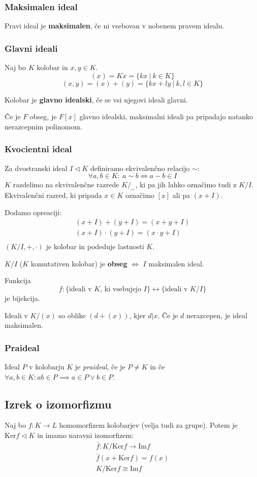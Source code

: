 \subsubsection*{Maksimalen ideal}
Pravi ideal je \textbf{maksimalen}, če ni vsebovan v nobenem pravem idealu.

\subsubsection*{Glavni ideali}
Naj bo $K$ kolobar in $x,y \in K$.
\[ (x) = Kx = \{kx\ |\ k \in K\}\]
\[ (x,y) = (x) + (y) = \{kx + ly\ |\ k,l \in K\}\]

Kolobar je \textbf{glavno idealski}, če se vsi njegovi ideali glavni.

Če je $F$ obseg, je $F[x]$ glavno idealski, maksimalni ideali pa pripadajo natanko nerazcepnim polinomom.

\subsubsection*{Kvocientni ideal}
Za dvostranski ideal $I \lhd K$ definiramo ekvivalenčno relacijo $\sim$:
\[ \forall a,b \in K:\ a \sim b \iff a-b \in I \]
$K$ razdelimo na ekvivalenčne razrede $K/_\sim$, ki pa jih lahko označimo tudi z $K/I$. Ekvivalenčni razred, ki pripada $x \in K$ označimo $[x]$ ali pa $(x+I)$.

Dodamo opreaciji:
\begin{align*}
	(x+I) + (y + I) = (x+y+I) \\
	(x+I) \cdot (y + I) = (x\cdot y+I) \\
\end{align*}
$(K/I, +, \cdot)$ je kolobar in podeduje lastnosti $K$.

$K/I$ ($K$ komutativen kolobar) je \textbf{obseg} $\iff$ $I$ maksimalen ideal.

Funkcija 
\[f: \{\text{ideali v $K$, ki vsebujejo $I$}\} \leftrightarrow \{\text{ideali v $K/I$}\}\] je bijekcija.

Ideali v $K/(x)$ so oblike $(d + (x))$, kjer $d | x$. Če je $d$ nerazcepen, je ideal maksimalen.

\subsubsection*{Praideal}
Ideal $P$ v kolobarju $K$ je \emph{praideal}, če je $P \neq K$ in če $\forall a,b \in K: ab \in P \implies a \in P \vee b \in P$.

\subsection*{Izrek o izomorfizmu}
Naj bo $f: K \to L$ homomorfizem kolobarjev (velja tudi za grupe). Potem je $\text{Ker}f \lhd K$ in imamo naravni izomorfizem:
\begin{align*}
	\bar{f}: K/\text{Ker}f \to \text{Im}f\\
	\bar{f} (x + \text{Ker}f) = f(x) \\
	K/\text{Ker}f \cong \text{Im}f
\end{align*}

